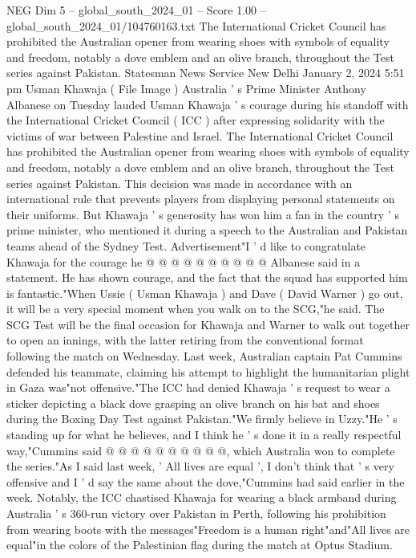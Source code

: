 \begin{textsample}{NEG Dim 5 – global\_south\_2024\_01 – Score 1.00 – global\_south\_2024\_01/104760163.txt}  \label{ex:f5_neg_439}
The International Cricket Council has prohibited the Australian opener from wearing shoes with symbols of equality and freedom, notably a dove emblem and an olive branch, throughout the Test series against Pakistan.
Statesman News Service New Delhi January 2, 2024 5:51 pm Usman Khawaja ( File Image ) Australia ' s Prime Minister Anthony Albanese on Tuesday lauded Usman Khawaja ' s courage during his standoff with the International Cricket Council ( ICC ) after expressing solidarity with the victims of war between Palestine and Israel.
The International Cricket Council has prohibited the Australian opener from wearing shoes with symbols of equality and freedom, notably a dove emblem and an olive branch, throughout the Test series against Pakistan.
This decision was made in accordance with an international rule that prevents players from displaying personal statements on their uniforms.
But Khawaja ' s generosity has won him a fan in the country ' s prime minister, who mentioned it during a speech to the Australian and Pakistan teams ahead of the Sydney Test.
Advertisement"I ' d like to congratulate Khawaja for the courage he @ @ @ @ @ @ @ @ @ @ Albanese said in a statement.
He has shown courage, and the fact that the squad has supported him is fantastic."When Ussie ( Usman Khawaja ) and Dave ( David Warner ) go out, it will be a very special moment when you walk on to the SCG,"he said.
The SCG Test will be the final occasion for Khawaja and Warner to walk out together to open an innings, with the latter retiring from the conventional format following the match on Wednesday.
Last week, Australian captain Pat Cummins defended his teammate, claiming his attempt to highlight the humanitarian plight in Gaza was"not offensive."The ICC had denied Khawaja ' s request to wear a sticker depicting a black dove grasping an olive branch on his bat and shoes during the Boxing Day Test against Pakistan."We firmly believe in Uzzy."He ' s standing up for what he believes, and I think he ' s done it in a really respectful way,"Cummins said @ @ @ @ @ @ @ @ @ @, which Australia won to complete the series."As I said last week, ' All lives are equal ', I don't think that ' s very offensive and I ' d say the same about the dove,"Cummins had said earlier in the week.
Notably, the ICC chastised Khawaja for wearing a black armband during Australia ' s 360-run victory over Pakistan in Perth, following his prohibition from wearing boots with the messages"Freedom is a human right"and"All lives are equal"in the colors of the Palestinian flag during the match at Optus Stadium.

\end{textsample}
